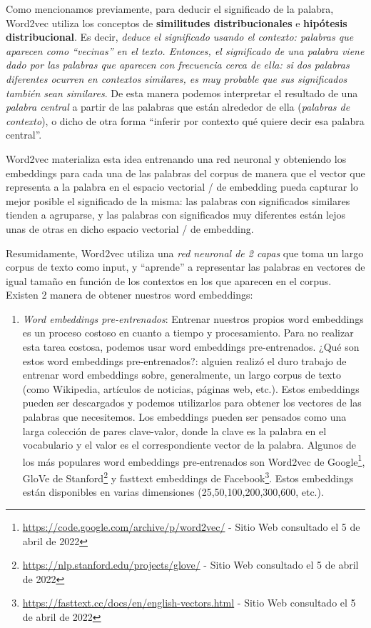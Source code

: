 \documentclass[12pt,a4paper]{article}
\begin{document}
\begin{sloppypar}
Como mencionamos previamente, para deducir el significado de la palabra, Word2vec utiliza los conceptos de \textbf{similitudes distribucionales} e \textbf{hipótesis distribucional}. Es decir, \textit{deduce el significado usando el contexto: palabras que aparecen como “vecinas” en el texto. Entonces, el significado de una palabra viene dado por las palabras que aparecen con frecuencia cerca de ella: si dos palabras diferentes ocurren en contextos similares, es muy probable que sus significados también sean similares}.  De esta manera podemos interpretar el resultado de una \textit{palabra central} a partir de las palabras que están alrededor de ella (\textit{palabras de contexto}), o dicho de otra forma “inferir por contexto qué quiere decir esa palabra central”. 

Word2vec materializa esta idea entrenando una red neuronal y obteniendo los embeddings para cada una de las palabras del corpus de manera que el vector que representa a la palabra en el espacio vectorial / de embedding pueda capturar lo mejor posible el significado de la misma: las palabras con significados similares tienden a agruparse, y las palabras con significados muy diferentes están lejos unas de otras en dicho espacio vectorial / de embedding.

Resumidamente, Word2vec utiliza una \textit{red neuronal de 2 capas} que toma un largo corpus de texto como input, y “aprende” a representar las palabras en vectores de igual tamaño en función de los contextos en los que aparecen en el corpus. 
\\

Existen 2 manera de obtener nuestros word embeddings\cite{NLP_26}: 
\begin{enumerate}

\item \textit{Word embeddings pre-entrenados}: Entrenar nuestros propios word embeddings es un proceso costoso en cuanto a tiempo y procesamiento. Para no realizar esta tarea costosa, podemos usar word embeddings pre-entrenados. ¿Qué son estos word embeddings pre-entrenados?: alguien realizó el duro trabajo de entrenar word embeddings sobre, generalmente, un largo corpus de texto (como Wikipedia, artículos de noticias, páginas web, etc.). Estos embeddings pueden ser descargados y podemos utilizarlos para obtener los vectores de las palabras que necesitemos. Los embeddings pueden ser pensados como una larga colección de pares clave-valor, donde la clave es la palabra en el vocabulario y el valor es el correspondiente vector de la palabra. Algunos de los más populares word embeddings pre-entrenados son Word2vec de Google\footnote{\url{https://code.google.com/archive/p/word2vec/} - Sitio Web consultado el 5 de abril de 2022}, GloVe de Stanford\footnote{\url{https://nlp.stanford.edu/projects/glove/} - Sitio Web consultado el 5 de abril de 2022} y fasttext embeddings de Facebook\footnote{\url{https://fasttext.cc/docs/en/english-vectors.html} - Sitio Web consultado el 5 de abril de 2022}. Estos embeddings están disponibles en varias dimensiones (25,50,100,200,300,600, etc.).


\end{enumerate}
\end{sloppypar}
\end{document}
